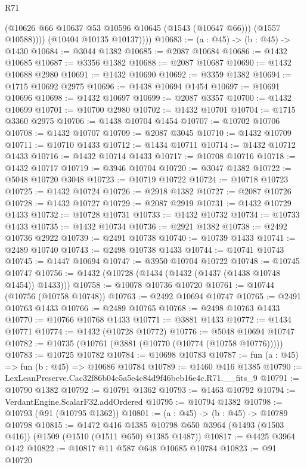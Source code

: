\begin{lexlean}{R71}
\begin{coremodule}
                (@10626 @66 @10637 @53 @10596 @10645 (@1543 (@10647 @66)))
                (@1557 @10588))))
          (@10404 @10135 @10137))))
@10683 := (a : @45) -> (b : @45) -> @1430
@10684 := @3044 @1382
@10685 := @2087 @10684
@10686 := @1432 @10685
@10687 := @3356 @1382
@10688 := @2087 @10687
@10690 := @1432 @10688 @2980
@10691 := @1432 @10690
@10692 := @3359 @1382
@10694 := @1715 @10692 @2975
@10696 := @1438 @10694 @1454
@10697 := @10691 @10696
@10698 := @1432 @10697
@10699 := @2087 @3357
@10700 := @1432 @10699
@10701 := @10700 @2980
@10702 := @1432 @10701
@10704 := @1715 @3360 @2975
@10706 := @1438 @10704 @1454
@10707 := @10702 @10706
@10708 := @1432 @10707
@10709 := @2087 @3045
@10710 := @1432 @10709
@10711 := @10710 @1433
@10712 := @1434 @10711
@10714 := @1432 @10712 @1433
@10716 := @1432 @10714 @1433
@10717 := @10708 @10716
@10718 := @1432 @10717
@10719 := @3946 @10704
@10720 := @3047 @1382
@10722 := @5048 @10720 @3048
@10723 := @10719 @10722
@10724 := @10718 @10723
@10725 := @1432 @10724
@10726 := @2918 @1382
@10727 := @2087 @10726
@10728 := @1432 @10727
@10729 := @2087 @2919
@10731 := @1432 @10729 @1433
@10732 := @10728 @10731
@10733 := @1432 @10732
@10734 := @10733 @1433
@10735 := @1432 @10734
@10736 := @2921 @1382
@10738 := @2492 @10736 @2922
@10739 := @2491 @10738
@10740 := @10739 @1433
@10741 := @2489 @10740
@10743 := @2498 @10738 @1433
@10744 := @10741 @10743
@10745 := @1447 @10694
@10747 := @3950 @10704 @10722
@10748 := @10745 @10747
@10756 := @1432 (@10728 (@1434 (@1432 (@1437 (@1438 @10748 @1454)) @1433)))
@10758 := @10078 @10736 @10720
@10761 := @10744 (@10756 (@10758 @10748))
@10763 := @2492 @10694 @10747
@10765 := @2491 @10763 @1433
@10766 := @2489 @10765
@10768 := @2498 @10763 @1433
@10770 := @10766 @10768 @1433
@10771 := @3881 @1433
@10772 := @1434 @10771
@10774 := @1432 (@10728 @10772)
@10776 := @5048 @10694 @10747
@10782 := @10735 (@10761 (@3881 (@10770 (@10774 (@10758 @10776)))))
@10783 := @10725 @10782
@10784 := @10698 @10783
@10787 := fun (a : @45) => fun (b : @45) => @10686 @10784
@10789 := @1460 @416 @1385
@10790 := LexLeanPreserve.Cac32f86b04c5a5e4c84d9f46beb16e4c.R71.__fits_9
@10791 := @10790 @1382
@10792 := @10791 @1362
@10793 := @1463 @10792
@10794 := VerdantEngine.ScalarF32.addOrdered
@10795 := @10794 @1382
@10798 := @10793 (@91 (@10795 @1362))
@10801 := (a : @45) -> (b : @45) -> @10789 @10798
@10815 := @1472
    @416
    @1385
    @10798
    @650
    @3964
    (@1493 (@1503 @416))
    (@1509 (@1510 (@1511 @650) @1385 @1487))
@10817 := @4425 @3964 @142
@10822 := @10817 @11 @587 @648 @10685 @10784
@10823 := @91 @10720

\end{coremodule}
\end{lexlean}

